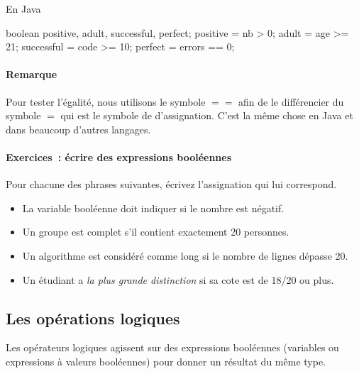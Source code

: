 			En Java

			\begin{java}
boolean positive, 
	adult, 
	successful, 
	perfect;
positive = nb > 0;
adult = age >= 21;
successful = code >= 10;
perfect = errors == 0;
			\end{java}

			\paragraph{Remarque}

			Pour tester l'égalité, nous utilisons le symbole $==$ afin de le 
			différencier du symbole $=$ qui est le symbole de d'assignation. 
			C'est la même chose en Java et dans beaucoup d'autres langages. 
		
			\begin{Emphase}
				\paragraph{Exercices~: écrire des expressions booléennes}
				Pour chacune des phrases suivantes,
				écrivez l’assignation qui lui correspond.
				\begin{itemize}
				\item 
					La variable booléenne 
					doit indiquer si le nombre  est négatif.
				\item
					Un groupe est complet s’il contient exactement 20 personnes.
				\item
					Un algorithme est considéré comme long si le nombre de lignes
					dépasse 20.
				\item 
					Un étudiant a \emph{la plus grande distinction} si sa cote est
					de 18/20 ou plus.
				\end{itemize}
			\end{Emphase}

		\subsection{Les opérations logiques}
	
			Les opérateurs logiques agissent sur des expressions booléennes 
			(variables ou expressions à valeurs booléennes) 
			pour donner un résultat du même type.
	
